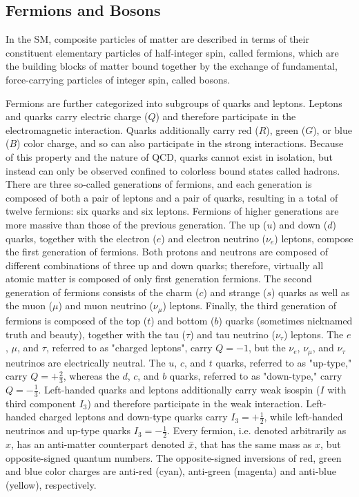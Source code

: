 \subsection{Fermions and Bosons}
In the SM, composite particles of matter are described in terms of their constituent elementary particles of half-integer spin, called fermions, which are the building blocks of matter bound together by the exchange of fundamental, force-carrying particles of integer spin, called bosons. 

Fermions are further categorized into subgroups of quarks and leptons.
Leptons and quarks carry electric charge ($Q$) and therefore participate in the electromagnetic interaction.
Quarks additionally carry red ($R$), green ($G$), or blue ($B$) color charge, and so can also participate in the strong interactions.
Because of this property and the nature of QCD, quarks cannot exist in isolation, but instead can only be observed confined to colorless bound states called hadrons.
There are three so-called generations of fermions, and each generation is composed of both a pair of leptons and a pair of quarks, resulting in a total of twelve fermions: six quarks and six leptons.
Fermions of higher generations are more massive than those of the previous generation.
The up ($u$) and down ($d$) quarks, together with the electron ($e$) and electron neutrino ($\nu_e$) leptons, compose the first generation of fermions.
Both protons and neutrons are composed of different combinations of three up and down quarks; therefore, virtually all atomic matter is composed of only first generation fermions.
The second generation of fermions consists of the charm ($c$) and strange ($s$) quarks as well as the muon ($\mu$) and muon neutrino ($\nu_\mu$) leptons.
Finally, the third generation of fermions is composed of the top ($t$) and bottom ($b$) quarks (sometimes nicknamed truth and beauty), together with the tau ($\tau$) and tau neutrino ($\nu_\tau$) leptons.
The $e$, $\mu$, and $\tau$, referred to as "charged leptons", carry $Q = -1$, but the $\nu_e$, $\nu_\mu$, and $\nu_\tau$ neutrinos are electrically neutral.
The $u$, $c$, and $t$ quarks, referred to as "up-type," carry $Q = +\frac{2}{3}$, whereas the $d$, $c$, and $b$ quarks, referred to as "down-type," carry $Q = -\frac{1}{3}$.
Left-handed quarks and leptons additionally carry weak isospin ($I$ with third component $I_3$) and therefore participate in the weak interaction.
Left-handed charged leptons and down-type quarks carry $I_3 = +\frac{1}{2}$, while left-handed neutrinos and up-type quarks $I_3 = -\frac{1}{2}$.
Every fermion, i.e. denoted arbitrarily as $x$, has an anti-matter counterpart denoted $\Bar{x}$, that has the same mass as $x$, but opposite-signed quantum numbers.
The opposite-signed inversions of red, green and blue color charges are anti-red (cyan), anti-green (magenta) and anti-blue (yellow), respectively.

